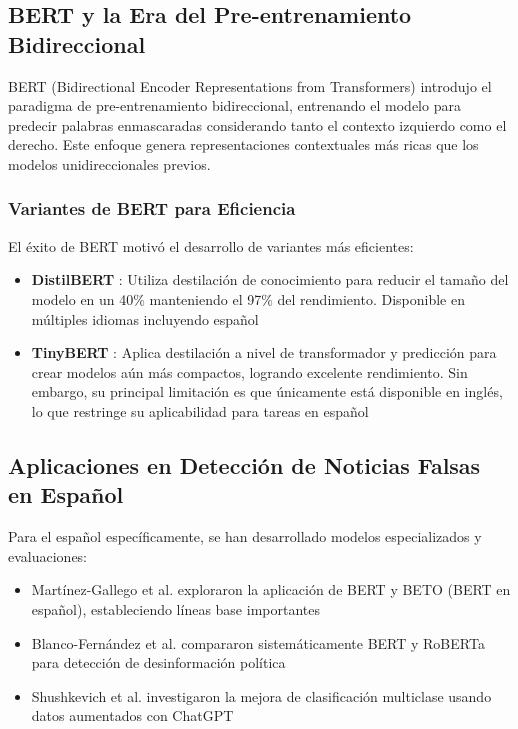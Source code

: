 \subsection{BERT y la Era del Pre-entrenamiento Bidireccional}

BERT (Bidirectional Encoder Representations from Transformers) \cite{devlin2018bert} introdujo el paradigma de pre-entrenamiento bidireccional, entrenando el modelo para predecir palabras enmascaradas considerando tanto el contexto izquierdo como el derecho. Este enfoque genera representaciones contextuales más ricas que los modelos unidireccionales previos.

\subsubsection{Variantes de BERT para Eficiencia}

El éxito de BERT motivó el desarrollo de variantes más eficientes:
\begin{itemize}
    \item \textbf{DistilBERT} \cite{sanh2019distilbert}: Utiliza destilación de conocimiento para reducir el tamaño del modelo en un 40\% manteniendo el 97\% del rendimiento. Disponible en múltiples idiomas incluyendo español
    \item \textbf{TinyBERT} \cite{jiao2019tinybert}: Aplica destilación a nivel de transformador y predicción para crear modelos aún más compactos, logrando excelente rendimiento. Sin embargo, su principal limitación es que únicamente está disponible en inglés, lo que restringe su aplicabilidad para tareas en español
\end{itemize}

\subsection{Aplicaciones en Detección de Noticias Falsas en Español}

Para el español específicamente, se han desarrollado modelos especializados y evaluaciones:
\begin{itemize}
    \item Martínez-Gallego et al. \cite{martinez2021fake} exploraron la aplicación de BERT y BETO (BERT en español), estableciendo líneas base importantes
    \item Blanco-Fernández et al. \cite{blanco2024enhancing} compararon sistemáticamente BERT y RoBERTa para detección de desinformación política
    \item Shushkevich et al. \cite{shushkevich2023improving} investigaron la mejora de clasificación multiclase usando datos aumentados con ChatGPT
\end{itemize}

